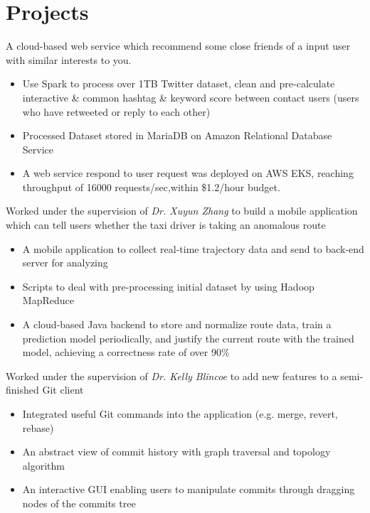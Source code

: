 \documentclass{resume}
\begin{document}
\section{Projects}
\begin{flushleft}

A cloud-based web service which recommend some close friends of a input user with similar interests to you.
\begin{itemize}
    \item Use Spark to process over 1TB Twitter dataset, clean and pre-calculate interactive \& common hashtag \linebreak \& keyword score between contact users (users who have retweeted or reply to each other)
    \item Processed Dataset stored in MariaDB on Amazon Relational Database Service
    \item A web service respond to user request was deployed on AWS EKS, reaching throughput of 16000 requests/sec,\linebreak within \$1.2/hour budget.
\end{itemize}

Worked under the supervision of \textit{Dr. Xuyun Zhang} to build a mobile application which can tell users whether \linebreak the taxi driver is taking an anomalous route
\begin{itemize}
    \item A mobile application to collect real-time trajectory data and send to back-end server for analyzing
    \item Scripts to deal with pre-processing initial dataset by using Hadoop MapReduce
    \item A cloud-based Java backend to store and normalize route data, train a prediction model periodically, \linebreak and justify the current route with the trained model, achieving a correctness rate of over 90\%
\end{itemize}

Worked under the supervision of \textit{Dr. Kelly Blincoe} to add new features to a semi-finished Git client
\begin{itemize}
    \item Integrated useful Git commands into the application (e.g. merge, revert, rebase)
    \item An abstract view of commit history with graph traversal and topology algorithm
    \item An interactive GUI enabling users to manipulate commits through dragging nodes of the commits tree
\end{itemize}
\end{flushleft}
\end{document}
